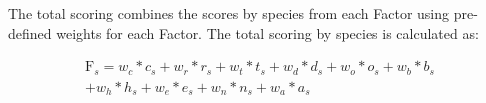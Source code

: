 \documentclass[11pt,
  english,
  a4paper,
]{article}
\begin{document}
\leavevmode\tagmcend\tagstructend


The total scoring combines the scores by species from each Factor using pre-defined weights for each Factor. The total scoring by species is calculated as:

\leavevmode\tagmcend\tagstructend\par


\begin{equation}
\begin{aligned}
    \text{F}_s = w_c*c_{s} + w_r*r_{s} + w_t*t_{s} + w_d*d_{s} + w_o*o_{s} + w_b*b_s \\
             + w_h*h_s + w_e*e_s + w_n*n_s + w_a*a_s
\end{aligned}
\end{equation}

\leavevmode\tagmcend\tagstructend\par

\end{document}
